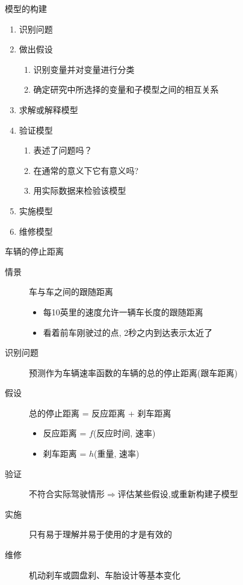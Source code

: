 \documentclass[UTF8, mathserif]{ctexbeamer}
\begin{document}
\begin{frame}{模型的构建}

  \begin{enumerate}
  \item 识别问题
  \item 做出假设
    \begin{enumerate}
    \item 识别变量并对变量进行分类
    \item 确定研究中所选择的变量和子模型之间的相互关系
    \end{enumerate}
  \item 求解或解释模型
  \item 验证模型
    \begin{enumerate}
    \item 表述了问题吗？
    \item 在通常的意义下它有意义吗?
    \item 用实际数据来检验该模型
    \end{enumerate}
  \item 实施模型
  \item 维修模型
  \end{enumerate}
  
\end{frame}

\begin{frame}{车辆的停止距离}

  \begin{description}
  \item[情景] 车与车之间的跟随距离
    \begin{itemize}
    \item 每10英里的速度允许一辆车长度的跟随距离
    \item 看着前车刚驶过的点, 2秒之内到达表示太近了
    \end{itemize}
  \item[识别问题] 预测作为车辆速率函数的车辆的总的停止距离(跟车距离)
  \item[假设] 总的停止距离 = 反应距离 + 刹车距离
    \begin{itemize}
    \item 反应距离 = $f$(反应时间, 速率)
    \item 刹车距离 = $h$(重量, 速率)
    \end{itemize}
  \item[验证] 不符合实际驾驶情形$\Rightarrow$评估某些假设,或重新构建子模型
  \item[实施] 只有易于理解并易于使用的才是有效的
  \item[维修] 机动刹车或圆盘刹、车胎设计等基本变化
  \end{description}
  
\end{frame}
\end{document}
